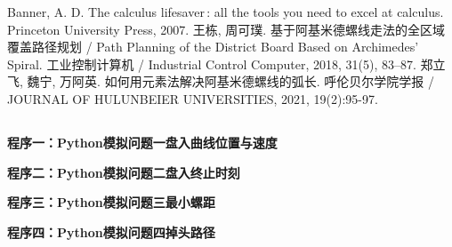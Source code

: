 \documentclass[withoutpreface,bwprint]{cumcmthesis}
\begin{document}
\newpage
\newpage
\begin{thebibliography}{99}  
	Banner, A. D. The calculus lifesaver : all the tools you need to excel at calculus. Princeton University Press, 2007.
	王栋, 周可璞. 基于阿基米德螺线走法的全区域覆盖路径规划 / Path Planning of the District Board Based on Archimedes’ Spiral. 工业控制计算机 / Industrial Control Computer, 2018, 31(5), 83–87.
	郑立飞, 魏宁, 万阿英. 如何用元素法解决阿基米德螺线的弧长. 呼伦贝尔学院学报 / JOURNAL OF HULUNBEIER UNIVERSITIES, 2021, 19(2):95-97.
\end{thebibliography}
\begin{appendices}
\pagestyle{plain} %

\section*{}
\newpage
\textbf{\textcolor[rgb]{0.00,0.00,0.00}{程序一：Python模拟问题一盘入曲线位置与速度}}


\textbf{\textcolor[rgb]{0.00,0.00,0.00}{程序二：Python模拟问题二盘入终止时刻}}


\textbf{\textcolor[rgb]{0.00,0.00,0.00}{程序三：Python模拟问题三最小螺距}}


\textbf{\textcolor[rgb]{0.00,0.00,0.00}{程序四：Python模拟问题四掉头路径}}

%
%
%
%
%
%
%
%
%
%
%
%
%
%



\end{appendices}
\end{document}
